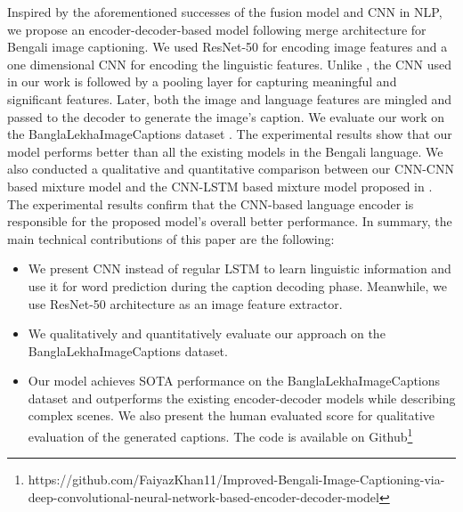 \documentclass[runningheads]{llncs}
\begin{document}
Inspired by the aforementioned successes of the fusion model and CNN in NLP, we propose an encoder-decoder-based model following merge architecture for Bengali image captioning. We used ResNet-50 \cite{resnet} for encoding image features and a one dimensional CNN for encoding the linguistic features. Unlike \cite{cnn+cnn}, the CNN used in our work is followed by a pooling layer for capturing meaningful and significant features. Later, both the image and language features are mingled and passed to the decoder to generate the image's caption. We evaluate our work on the BanglaLekhaImageCaptions dataset \cite{BanglalekhaImageCaptions}. The experimental results show that our model performs better than all the existing models in the Bengali language. We also conducted a qualitative and quantitative comparison between our CNN-CNN based mixture model and the CNN-LSTM based mixture model proposed in \cite{role_of_rnn}. The experimental results confirm that the CNN-based language encoder is responsible for the proposed model's overall better performance. In summary, the main technical contributions of this paper are the following:
\begin{itemize}
    \item We present CNN instead of regular LSTM to learn linguistic information and use it for word prediction during the caption decoding phase. Meanwhile, we use ResNet-50 \cite{resnet} architecture as an image feature extractor. 
    \item We qualitatively and quantitatively evaluate our approach on the BanglaLekhaImageCaptions dataset.
    \item Our model achieves SOTA performance on the BanglaLekhaImageCaptions dataset and outperforms the existing encoder-decoder models while describing complex scenes. We also present the human evaluated score for qualitative evaluation of the generated captions. The code is available on Github\footnote{https://github.com/FaiyazKhan11/Improved-Bengali-Image-Captioning-via-deep-convolutional-neural-network-based-encoder-decoder-model}
\end{itemize}
\end{document}
